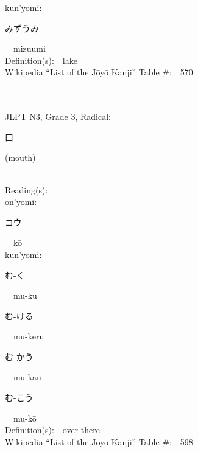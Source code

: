 \begin{multicols}{2}
{\hspace*{1em}}kun'yomi:\ \ \\
{\hspace*{2em}}{\begin{CJK}{UTF8}{min} みずうみ \end{CJK}}\ \ mizuumi\ \ \\
Definition(s):\ \ lake \\
Wikipedia ``List of the J\=oy\=o Kanji'' Table \#:\ \ 570 \\
\ \ \\
{\fontsize{34pt}{40pt}  }\ \ \\  %
{JLPT N3, Grade 3, Radical:\ \ {\begin{CJK}{UTF8}{min} 口 \end{CJK}} (mouth) } \\
Reading(s):\ \ \\
{\hspace*{1em}}on'yomi:\ \ \\
{\hspace*{2em}}{\begin{CJK}{UTF8}{min} コウ \end{CJK}}\ \ k\=o\ \ \\
{\hspace*{1em}}kun'yomi:\ \ \\
{\hspace*{2em}}{\begin{CJK}{UTF8}{min} む-く \end{CJK}}\ \ mu-ku\ \ \\
{\hspace*{2em}}{\begin{CJK}{UTF8}{min} む-ける \end{CJK}}\ \ mu-keru\ \ \\
{\hspace*{2em}}{\begin{CJK}{UTF8}{min} む-かう \end{CJK}}\ \ mu-kau\ \ \\
{\hspace*{2em}}{\begin{CJK}{UTF8}{min} む-こう \end{CJK}}\ \ mu-k\=o\ \ \\
Definition(s):\ \ over there \\
Wikipedia ``List of the J\=oy\=o Kanji'' Table \#:\ \ 598 \\

\end{multicols}
